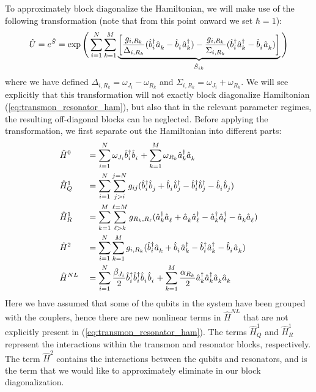 To approximately block diagonalize the Hamiltonian, we will make use of the following transformation (note that from this point onward we set $\hbar = 1$): 
\begin{equation}\label{eq:sw_transform}
    \hat{U} = e^{\hat{S}} = \exp\Bigg( \sum_{i=1}^N \sum_{k=1}^M \underbrace{\left[ \frac{g_{i,R_k}}{\Delta_{i,R_k}} (\opbd_i\opa_k - \opb_i\opad_k) - \frac{g_{i,R_k}}{\Sigma_{i,R_k}}(\opbd_i\opad_k - \opb_i\opa_k) \right]}_{\hat{S}_{ik}} \Bigg) 
\end{equation}
where we have defined $\Delta_{i,R_k} = \omega_{J_i} - \omega_{R_k}$ and $\Sigma_{i,R_k} = \omega_{J_i} + \omega_{R_k}$. We will see explicitly that this transformation will not exactly block diagonalize Hamiltonian (\ref{eq:transmon_resonator_ham}), but also that in the relevant parameter regimes, the resulting off-diagonal blocks can be neglected. Before applying the transformation, we first separate out the Hamiltonian into different parts:
\begin{alignat}{2}
    &\hat{H}^0 &&= \sum_{i=1}^N \omega_{J_i}\opbd_i\opb_i + \sum_{k=1}^M \omega_{R_k}\opad_k\opa_k \\
    &\hat{H}^1_Q &&= \sum_{i=1}^N \sum_{j > i}^{j=N} g_{ij} (\opbd_i\opb_j + \opb_i\opbd_j - \opbd_i\opbd_j - \opb_i\opb_j)  \\
    &\hat{H}^1_R &&= \sum_{k=1}^M \sum_{\ell > k}^{\ell = M} g_{R_k,R_\ell} (\opad_k\opa_\ell + \opa_k\opad_\ell - \opad_k\opad_\ell - \opa_k\opa_\ell) \\
    &\hat{H}^2 &&= \sum_{i=1}^N \sum_{k=1}^M g_{i,R_k}(\opbd_i\opa_k + \opb_i\opad_k - \opbd_i\opad_k - \opb_i\opa_k) \\
    &\hat{H}^{NL} &&= \sum_{i=1}^N \frac{\beta_{J_i}}{2}\opbd_i\opbd_i\opb_i\opb_i + \sum_{k=1}^M \frac{\alpha_{R_k}}{2} \opad_k\opad_k\opa_k\opa_k \label{eq:H_nonlinear}
\end{alignat}
Here we have assumed that some of the qubits in the system have been grouped with the couplers, hence there are new nonlinear terms in $\hat{H}^{NL}$ that are not explicitly present in (\ref{eq:transmon_resonator_ham}). The terms $\hat{H}^1_Q$ and $\hat{H}^1_R$ represent the interactions within the transmon and resonator blocks, respectively. The term $\hat{H}^2$ contains the interactions between the qubits and resonators, and is the term that we would like to approximately eliminate in our block diagonalization.

